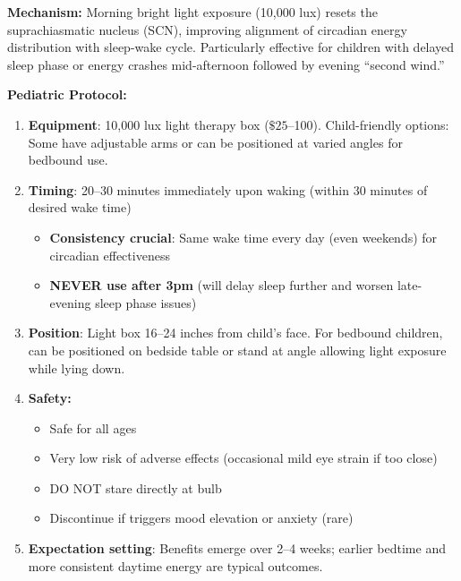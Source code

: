 \begin{recommendation}
\label{rec:circadian-light-ped-severe}

\textbf{Mechanism:} Morning bright light exposure (10,000 lux) resets the suprachiasmatic nucleus (SCN), improving alignment of circadian energy distribution with sleep-wake cycle. Particularly effective for children with delayed sleep phase or energy crashes mid-afternoon followed by evening ``second wind.''

\textbf{Pediatric Protocol:}

\begin{enumerate}
    \item \textbf{Equipment}: 10,000 lux light therapy box ($\$25$--100). Child-friendly options: Some have adjustable arms or can be positioned at varied angles for bedbound use.

    \item \textbf{Timing}: 20--30 minutes immediately upon waking (within 30 minutes of desired wake time)
    \begin{itemize}
        \item \textbf{Consistency crucial}: Same wake time every day (even weekends) for circadian effectiveness
        \item \textbf{NEVER use after 3pm} (will delay sleep further and worsen late-evening sleep phase issues)
    \end{itemize}

    \item \textbf{Position}: Light box 16--24 inches from child's face. For bedbound children, can be positioned on bedside table or stand at angle allowing light exposure while lying down.

    \item \textbf{Safety:}
    \begin{itemize}
        \item Safe for all ages
        \item Very low risk of adverse effects (occasional mild eye strain if too close)
        \item DO NOT stare directly at bulb
        \item Discontinue if triggers mood elevation or anxiety (rare)
    \end{itemize}

    \item \textbf{Expectation setting}: Benefits emerge over 2--4 weeks; earlier bedtime and more consistent daytime energy are typical outcomes.
\end{enumerate}


\end{recommendation}
